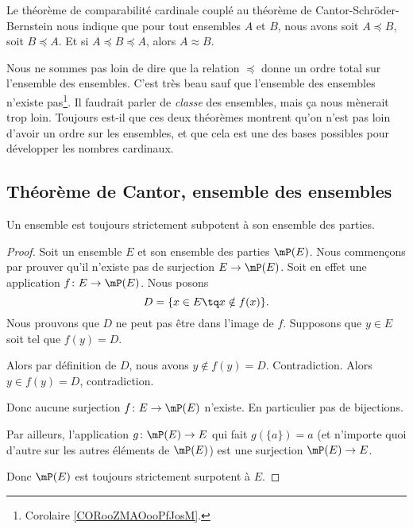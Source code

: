\begin{normaltext}
	Le théorème de comparabilité cardinale couplé au théorème de Cantor-Schröder-Bernstein nous indique que pour tout ensembles \( A\) et \( B\), nous avons soit \( A\preceq B\), soit \( B\preceq A\). Et si \( A\preceq B\preceq A\), alors \( A\approx B\).

	Nous ne sommes pas loin de dire que la relation \( \preceq\) donne un ordre total sur l'ensemble des ensembles. C'est très beau sauf que l'ensemble des ensembles n'existe pas\footnote{Corolaire \ref{CORooZMAOooPfJosM}.}. Il faudrait parler de \emph{classe} des ensembles, mais ça nous mènerait trop loin. Toujours est-il que ces deux théorèmes montrent qu'on n'est pas loin d'avoir un ordre sur les ensembles, et que cela est une des bases possibles pour développer les nombres cardinaux.
\end{normaltext}

\subsection{Théorème de Cantor, ensemble des ensembles}

\begin{theorem}     \label{THOooJPNFooWSxUhd}
	Un ensemble est toujours strictement subpotent à son ensemble des parties.
\end{theorem}

\begin{proof}
	Soit un ensemble \( E\) et son ensemble des parties \( \mP(E)\). Nous commençons par prouver qu'il n'existe pas de surjection \( E\to \mP(E)\). Soit en effet une application \( f\colon E\to \mP(E)\). Nous posons
	\begin{equation}
		D=\{ x\in E\tq x\notin f(x) \}.
	\end{equation}
	Nous prouvons que \( D\) ne peut pas être dans l'image de \( f\). Supposons que \( y\in E\) soit tel que \( f(y)=D\).
	\begin{subproof}
		\spitem[Si \( y\in D\)]
		Alors par définition de \( D\), nous avons \( y\notin f(y)=D\). Contradiction.
		\spitem[Si \( y\notin D\)]
		Alors \( y\in f(y)=D\), contradiction.
	\end{subproof}
	Donc aucune surjection \( f\colon E\to \mP(E)\) n'existe. En particulier pas de bijections.

	Par ailleurs, l'application \( g\colon \mP(E)\to E\) qui fait \( g(\{ a \})=a\) (et n'importe quoi d'autre sur les autres éléments de \( \mP(E)\)) est une surjection \( \mP(E)\to E\).

	Donc \( \mP(E)\) est toujours strictement surpotent à \( E\).
\end{proof}

